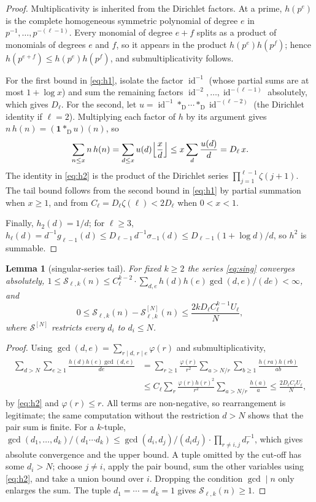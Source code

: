 \documentclass[11pt,a4paper]{article}
\newtheorem{lemma}[theorem]{Lemma}
\theoremstyle{remark}
\numberwithin{equation}{section}
\newcommand{\Sing}{\mathcal S}
\newcommand{\id}{\operatorname{id}}
\newcommand{\Dc}{*_{\mathrm D}}
\newcommand{\one}{\mathbf 1}
\begin{document}
\begin{proof}
Multiplicativity is inherited from the Dirichlet factors. At a prime, $h(p^e)$ is the complete homogeneous symmetric polynomial of degree $e$ in $p^{-1},\dots,p^{-(\ell-1)}$. Every monomial of degree $e+f$ splits as a product of monomials of degrees $e$ and $f$, so it appears in the product $h(p^e)h(p^f)$; hence $h(p^{e+f})\le h(p^e)h(p^f)$, and submultiplicativity follows.

For the first bound in \eqref{eq:h1}, isolate the factor $\id^{-1}$ (whose partial sums are at most $1+\log x$) and sum the remaining factors $\id^{-2},\dots,\id^{-(\ell-1)}$ absolutely, which gives $D_\ell$. For the second, let $u=\id^{-1}\Dc\cdots\Dc\id^{-(\ell-2)}$ (the Dirichlet identity if $\ell=2$). Multiplying each factor of $h$ by its argument gives $n\,h(n)=(\one\Dc u)(n)$, so
\[
\sum_{n\le x}n\,h(n)=\sum_{d\le x}u(d)\Bigl\lfloor\frac xd\Bigr\rfloor\le x\sum_d\frac{u(d)}d=D_\ell\,x .
\]
The identity in \eqref{eq:h2} is the product of the Dirichlet series $\prod_{j=1}^{\ell-1}\zeta(j+1)$. The tail bound follows from the second bound in \eqref{eq:h1} by partial summation when $x\ge1$, and from $C_\ell=D_\ell\zeta(\ell)<2D_\ell$ when $0<x<1$.

Finally, $h_2(d)=1/d$; for $\ell\ge3$, $h_\ell(d)=d^{-1}g_{\ell-1}(d)\le D_{\ell-1}\,d^{-1}\sigma_{-1}(d)\le D_{\ell-1}(1+\log d)/d$, so $h^2$ is summable.
\end{proof}

\begin{lemma}[singular-series tail]\label{lem:tail}
For fixed $k\ge2$ the series \eqref{eq:sing} converges absolutely, $1\le\Sing_{\ell,k}(n)\le C_\ell^{k-2}\cdot\sum_{d,e}h(d)h(e)\gcd(d,e)/(de)<\infty$, and
\begin{equation}\label{eq:tail}
0\le\Sing_{\ell,k}(n)-\Sing^{[N]}_{\ell,k}(n)\le\frac{2kD_\ell C_\ell^{k-1}U_\ell}{N},
\end{equation}
where $\Sing^{[N]}$ restricts every $d_i$ to $d_i\le N$.
\end{lemma}

\begin{proof}
Using $\gcd(d,e)=\sum_{r\mid d,\,r\mid e}\varphi(r)$ and submultiplicativity,
\[
\begin{aligned}\sum_{d>N}\sum_{e\ge1}\frac{h(d)h(e)\gcd(d,e)}{de}
&=\sum_{r\ge1}\frac{\varphi(r)}{r^2}\sum_{a>N/r}\sum_{b\ge1}\frac{h(ra)h(rb)}{ab}
\\&\le C_\ell\sum_{r}\frac{\varphi(r)h(r)^2}{r^2}\sum_{a>N/r}\frac{h(a)}a
\le\frac{2D_\ell C_\ell U_\ell}{N},\end{aligned}
\]
by \eqref{eq:h2} and $\varphi(r)\le r$. All terms are non-negative, so rearrangement is legitimate; the same computation without the restriction $d>N$ shows that the pair sum is finite. For a $k$-tuple, $\gcd(d_1,\dots,d_k)/(d_1\cdots d_k)\le\gcd(d_i,d_j)/(d_id_j)\cdot\prod_{r\ne i,j}d_r^{-1}$, which gives absolute convergence and the upper bound. A tuple omitted by the cut-off has some $d_i>N$; choose $j\ne i$, apply the pair bound, sum the other variables using \eqref{eq:h2}, and take a union bound over $i$. Dropping the condition $\gcd\mid n$ only enlarges the sum. The tuple $d_1=\cdots=d_k=1$ gives $\Sing_{\ell,k}(n)\ge1$.
\end{proof}
\end{document}
